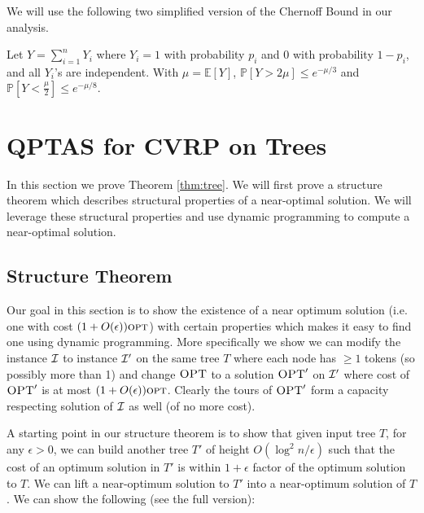 \documentclass[twoside,leqno]{article}
\newcommand{\calI}{{\cal I}}
\newcommand{\Prob}[1]{\mathbb{P}{\left[#1\right]}}
\newcommand{\Ex}[1]{\mathbb{E}{\left[#1\right]}}
\newcommand{\opt}{\mbox{\sc opt}}
\newcommand{\OPT}{\mbox{\sc OPT}}
\newcommand{\eps}{\epsilon}
\begin{document}
We will use the following two simplified version of the Chernoff Bound \cite{Mitzenmacher} in our analysis. 
\begin{lemma}
Let $Y = \sum_{i = 1}^n Y_i$ where $Y_i = 1$ with probability $p_i$ and 0 with probability $1- p_i$, and all $Y_i$'s are independent. With $\mu = \Ex{Y}$,  $\Prob{Y > 2\mu} \le e^{-\mu/3}$
and $\Prob{Y < \frac{\mu}{2}} \le e^{-\mu/8}.$
\end{lemma}

\section{QPTAS for CVRP on Trees}
In this section we prove Theorem \ref{thm:tree}. 
We will first prove a structure theorem which describes structural properties of a near-optimal solution. We will leverage these structural properties and use dynamic programming to compute a near-optimal solution. 

\subsection{Structure Theorem}

Our goal in this section is to show the existence of a near optimum solution (i.e. one with cost $(1 + O(\eps))\opt$) with
certain properties which makes it easy to find one using dynamic programming.
More specifically we show we can modify the instance $\calI$ to instance $\calI'$ on the same tree $T$ where each node has $\geq 1$
tokens (so possibly more than 1) and change $\OPT$ to a solution $\OPT'$ on $\calI'$ where cost of $\OPT'$ is at most
$(1+O(\eps))\opt$. Clearly the tours of $\OPT'$ form a capacity respecting solution of $\calI$ as well (of no more cost).

A starting point in our structure theorem is to show that given input tree $T$, for any $\epsilon>0$, we can build another tree $T'$ of height $O(\log^2 n/\epsilon)$ such that the cost of an
optimum solution in $T'$ is within $1+\epsilon$ factor of the optimum solution to $T$. We can lift a near-optimum solution to $T'$ into a near-optimum solution of $T$. 
We can show the following (see the full version): 
\end{document}
